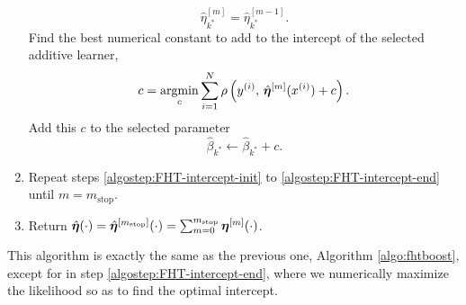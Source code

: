 \begin{enumerate}
\begin{equation}
            \hat{\eta}^{[m]}_{k^*}=\hat{\eta}^{[m-1]}_{k^*}.
        \end{equation}
        Find the best numerical constant to add to the intercept of the selected additive learner,
        \begin{equation}
            c=\operatorname*{argmin}_c \sum_{i=1}^N\rho\left(y^{(i)},\,\hat{\boldsymbol{\eta}}^{[m]}(x^{(i)}) + c \right).
        \end{equation}
        Add this $c$ to the selected parameter
        \begin{equation}
            \hat{\beta}_{k^*}\gets\hat{\beta}_{k^*}+c.
        \end{equation}
    \item Repeat steps \ref{algostep:FHT-intercept-init} to \ref{algostep:FHT-intercept-end} until $m=m_{\text{stop}}$.
    \item Return $\hat{\boldsymbol{\eta}}(\cdot)=\hat{\boldsymbol{\eta}}^{[m_{\text{stop}}]}(\cdot)=\sum_{m=0}^{m_{\text{stop}}}\boldsymbol{\eta}^{[m]}(\cdot)$.
\end{enumerate}
This algorithm is exactly the same as the previous one, Algorithm \ref{algo:fhtboost}, except for in step \ref{algostep:FHT-intercept-end}, where we numerically maximize the likelihood so as to find the optimal intercept.

